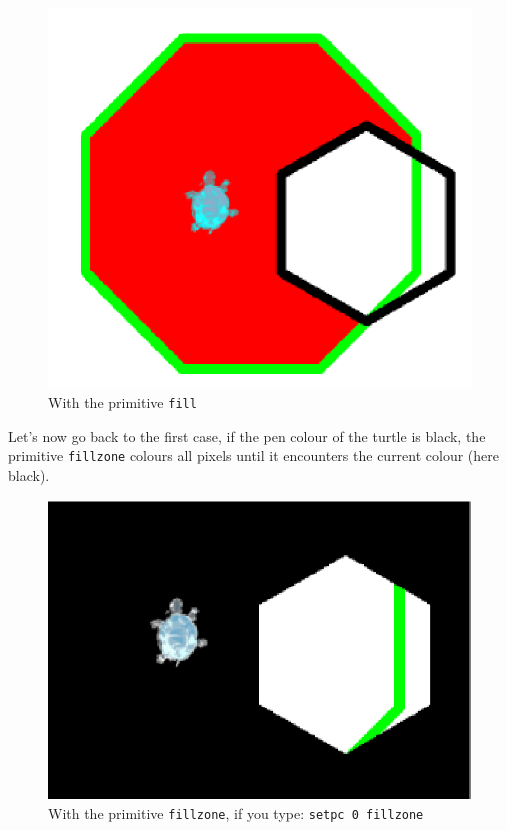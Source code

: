 \begin{figure}[h]
\begin{center}
\includegraphics*[scale=0.2]{pics/remplis1.png}                                                 \end{center}
\caption {With the primitive \texttt{fill}}
\end{figure}
\noindent Let's now go back to the first case, if the pen colour of the turtle is black, the primitive \texttt{fillzone} colours all pixels until it encounters the current colour (here black).
\begin{figure}[h]
\begin{center}
\includegraphics*[scale=0.2]{pics/remplis2.png}                                                 \end{center}
\caption {With the primitive \texttt{fillzone}, if you type: \texttt{setpc 0 fillzone} }
\end{figure}

